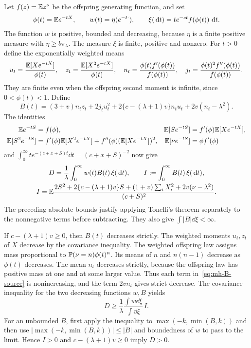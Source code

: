 Let $f(z)=\mathbb E z^\nu$ be the offspring generating function, and set
\[
 \phi(t)=\mathbb E e^{-tX},\qquad
 w(t)=\eta(e^{-t\cdot}),\qquad
 \xi(\,\mathrm d t)=t e^{-ct}f(\phi(t))\,\,\mathrm d t.
\]
The function $w$ is positive, bounded and decreasing, because $\eta$ is a finite positive measure with $\eta\ge b\pi_\lambda$. The measure $\xi$ is finite, positive and nonzero. For $t>0$ define the exponentially weighted means
\[
 u_t=\frac{\mathbb E[Xe^{-tX}]}{\phi(t)},\quad
 z_t=\frac{\mathbb E[X^2e^{-tX}]}{\phi(t)},\quad
 n_t=\frac{\phi(t)f'(\phi(t))}{f(\phi(t))},\quad
 j_t=\frac{\phi(t)^2f''(\phi(t))}{f(\phi(t))}.
\]
They are finite even when the offspring second moment is infinite, since $0<\phi(t)<1$. Define
\begin{equation}\label{eq:mh-B-source}
 B(t)=(3+v)n_tz_t+2j_tu_t^2
       +2\{c-(\lambda+1)v\}n_tu_t+2v(n_t-\lambda^2).
\end{equation}
The identities
\begin{align*}
 \mathbb E e^{-tS}&=f(\phi),&
 \mathbb E[Se^{-tS}]&=f'(\phi)\mathbb E[Xe^{-tX}],\\
 \mathbb E[S^2e^{-tS}]&=f'(\phi)\mathbb E[X^2e^{-tX}]
                         +f''(\phi)(\mathbb E[Xe^{-tX}])^2,&
 \mathbb E[\nu e^{-tS}]&=\phi f'(\phi)
\end{align*}
and $\int_0^\infty te^{-(c+x+S)t}\dd t=(c+x+S)^{-2}$ now give
\begin{equation}\label{eq:mh-signed-integral}
 \begin{gathered}
 D=\frac1\lambda\int_0^\infty w(t)B(t)\,\xi(\,\mathrm d t),\qquad
 I:=\int_0^\infty B(t)\,\xi(\,\mathrm d t),\\
 I=\mathbb E\frac{2S^2+2\{c-(\lambda+1)v\}S
 +(1+v)\sum_iX_i^2+2v(\nu-\lambda^2)}{(c+S)^2}.
 \end{gathered}
\end{equation}
The preceding absolute bounds justify applying Tonelli's theorem separately to the nonnegative terms before subtracting. They also give $\int|B|\dd\xi<\infty$.

If $c-(\lambda+1)v\ge0$, then $B(t)$ decreases strictly. The weighted moments $u_t,z_t$ of $X$ decrease by the covariance inequality. The weighted offspring law assigns mass proportional to $\mathbb P(\nu=n)\phi(t)^n$. Its means of $n$ and $n(n-1)$ decrease as $\phi(t)$ decreases. The mean $n_t$ decreases strictly, because the offspring law has positive mass at one and at some larger value. Thus each term in~\eqref{eq:mh-B-source} is nonincreasing, and the term $2vn_t$ gives strict decrease. The covariance inequality for the two decreasing functions $w,B$ yields
\begin{equation}\label{eq:mh-source-Chebyshev}
 D\ge\frac1\lambda\frac{\int w\dd\xi}{\int\dd\xi}\,I.
\end{equation}
For an unbounded $B$, first apply the inequality to $\max(-k,\min(B,k))$ and then use $|\max(-k,\min(B,k))|\le|B|$ and boundedness of $w$ to pass to the limit. Hence $I>0$ and $c-(\lambda+1)v\ge0$ imply $D>0$.

